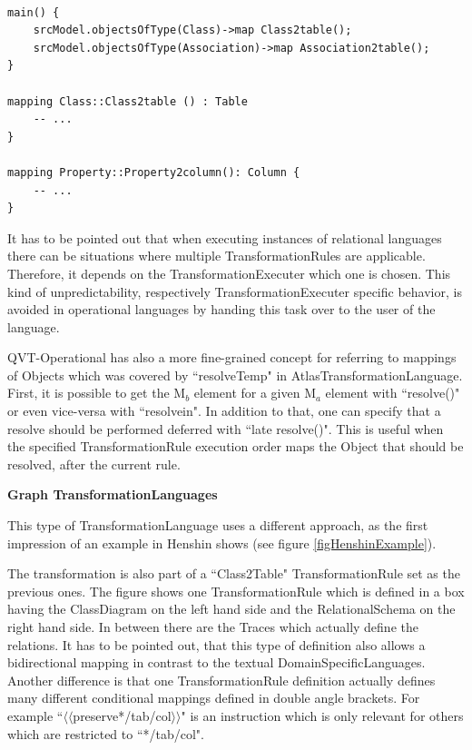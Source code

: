 \begin{lstlisting}[language=QVT,caption={QVT Operational example},label={lstQVToExample}]

main() {
	srcModel.objectsOfType(Class)->map Class2table();
	srcModel.objectsOfType(Association)->map Association2table(); 
}
	
mapping Class::Class2table () : Table
	-- ...
} 
	
mapping Property::Property2column(): Column {
	-- ...
} 	
\end{lstlisting}

It has to be pointed out that when executing instances of relational languages there can be situations where multiple \glspl{TransformationRule} are applicable. Therefore, it depends on the \gls{TransformationExecuter} which one is chosen. This kind of unpredictability, respectively \gls{TransformationExecuter} specific behavior, is avoided in operational languages by handing this task over to the user of the language.

QVT-Operational has also a more fine-grained concept \cite{ObjectManagementGroup2011} for referring to mappings of \glspl{Object} which was covered by ``resolveTemp" in \gls{AtlasTransformationLanguage}. First, it is possible to get the M$_b$ element for a given M$_a$ element with ``resolve()" or even vice-versa with ``resolvein". In addition to that, one can specify that a resolve should be performed deferred with ``late resolve()". This is useful when the specified \gls{TransformationRule} execution order maps the \gls{Object} that should be resolved, after the current rule.

\textbf{Graph \glspl{TransformationLanguage}} 

This type of \gls{TransformationLanguage} uses a different approach, as the first impression of an example in Henshin \cite{EclipseFoundation2013a} shows (see figure \ref{figHenshinExample}).

The transformation is also part of a ``\Gls{Class}2Table" \gls{TransformationRule} set as the previous ones. The figure shows one \gls{TransformationRule} which is defined in a box having the \gls{ClassDiagram} on the left hand side and the \gls{RelationalSchema} on the right hand side. In between there are the \glspl{Trace} which actually define the relations. It has to be pointed out, that this type of definition also allows a bidirectional mapping in contrast to the textual \glspl{DomainSpecificLanguage}. Another difference is that one \gls{TransformationRule} definition actually defines many different conditional mappings defined in double angle brackets. For example ``$\langle\langle$preserve*/tab/col$\rangle\rangle$" is an instruction which is only relevant for others which are restricted to ``*/tab/col".
		
